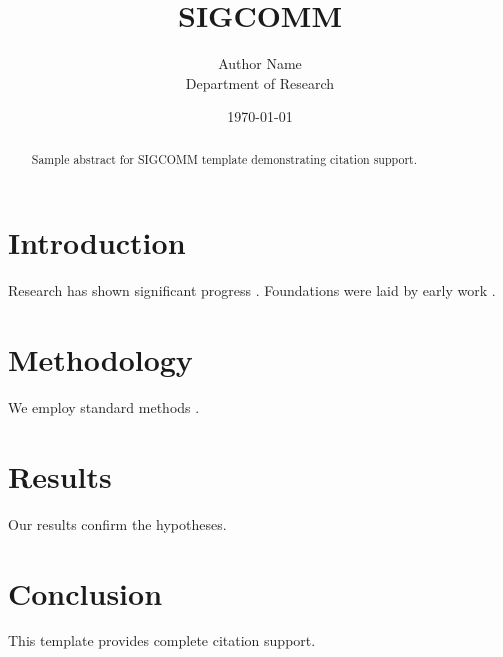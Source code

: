 \documentclass{article}
\title{SIGCOMM}
\author{Author Name \\ \small Department of Research}
\date{\today}
\begin{document}
\maketitle

\begin{abstract}
Sample abstract for SIGCOMM template demonstrating citation support.
\end{abstract}

\section{Introduction}
Research has shown significant progress \citep{einstein1905}. Foundations were laid by early work \citep{turing1950}.

\section{Methodology}
We employ standard methods \citep{knuth1984}.

\section{Results}
Our results confirm the hypotheses.

\section{Conclusion}
This template provides complete citation support.



\end{document}
